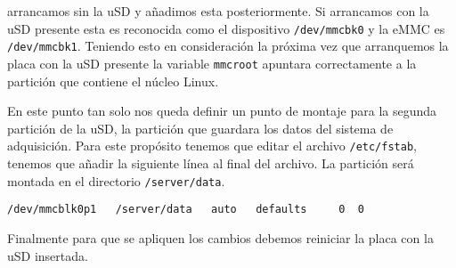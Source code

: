 		arrancamos sin la uSD y añadimos esta posteriormente. Si arrancamos con la uSD presente esta es reconocida como el dispositivo
		\texttt{/dev/mmcbk0} y la eMMC es \texttt{/dev/mmcbk1}. Teniendo esto en consideración la próxima vez que arranquemos la placa con la
		uSD presente la variable \texttt{mmcroot} apuntara correctamente a la partición que contiene el núcleo Linux.
		\par
		En este punto tan solo nos queda definir un punto de montaje para la segunda partición de la uSD, la partición que guardara los datos
		del sistema de adquisición. Para este propósito tenemos que editar el archivo \texttt{/etc/fstab}, tenemos que añadir la siguiente
		línea al final del archivo. La partición será montada en el directorio \texttt{/server/data}.
		\begin{lstlisting}[style=myFile]
/dev/mmcblk0p1   /server/data   auto   defaults     0  0
		\end{lstlisting}
		Finalmente para que se apliquen los cambios debemos reiniciar la placa con la uSD insertada.
